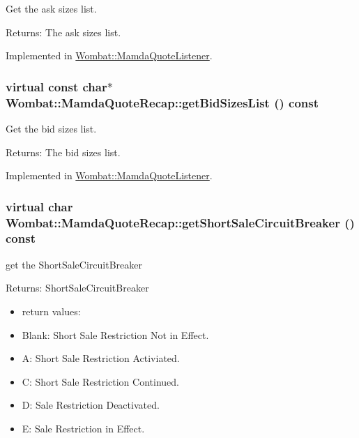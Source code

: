 Get the ask sizes list. 

\begin{Desc}
\item[Returns:]The ask sizes list. \end{Desc}


Implemented in \hyperlink{classWombat_1_1MamdaQuoteListener_9aa5070318fdfb0cc239fb6f11e286c0}{Wombat::Mamda\-Quote\-Listener}.\hypertarget{classWombat_1_1MamdaQuoteRecap_38b96c274919a6554a103604e582ac87}{
\subsubsection[getBidSizesList]{\setlength{\rightskip}{0pt plus 5cm}virtual const char$\ast$ Wombat::Mamda\-Quote\-Recap::get\-Bid\-Sizes\-List () const}}
\label{classWombat_1_1MamdaQuoteRecap_38b96c274919a6554a103604e582ac87}


Get the bid sizes list. 

\begin{Desc}
\item[Returns:]The bid sizes list. \end{Desc}


Implemented in \hyperlink{classWombat_1_1MamdaQuoteListener_93be6aa13008fc17858aafac4d212eb5}{Wombat::Mamda\-Quote\-Listener}.\hypertarget{classWombat_1_1MamdaQuoteRecap_b9d92f8b80dfe1efbb6452ce38c192b8}{
\subsubsection[getShortSaleCircuitBreaker]{\setlength{\rightskip}{0pt plus 5cm}virtual char Wombat::Mamda\-Quote\-Recap::get\-Short\-Sale\-Circuit\-Breaker () const}}
\label{classWombat_1_1MamdaQuoteRecap_b9d92f8b80dfe1efbb6452ce38c192b8}


get the Short\-Sale\-Circuit\-Breaker 

\begin{Desc}
\item[Returns:]Short\-Sale\-Circuit\-Breaker \begin{itemize}
\item return values: \item Blank: Short Sale Restriction Not in Effect. \item A: Short Sale Restriction Activiated. \item C: Short Sale Restriction Continued. \item D: Sale Restriction Deactivated. \item E: Sale Restriction in Effect. \end{itemize}
\end{Desc}


